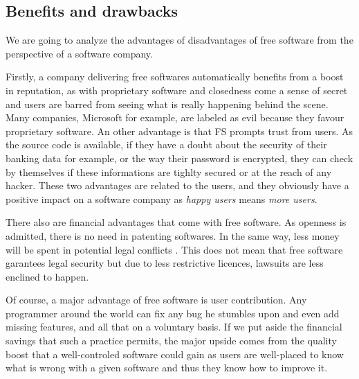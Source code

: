 \documentclass[12pt]{article}
\begin{document}
\subsection{Benefits and drawbacks}

We are going to analyze the advantages of disadvantages of free
software from the perspective of a software company.

Firstly, a company delivering free softwares automatically benefits
from a boost in reputation, as with proprietary software and
closedness come a sense of secret and users are barred from seeing
what is really happening behind the scene. Many companies, Microsoft
for example, are labeled as evil because they favour proprietary
software. An other advantage is that FS prompts trust from users. As
the source code is available, if they have a doubt about the security
of their banking data for example, or the way their password is
encrypted, they can check by themselves if these informations are
tighlty secured or at the reach of any hacker. These two advantages
are related to the users, and they obviously have a positive impact on
a software company as \textit{happy users} means \textit{more users}.

There also are financial advantages that come with free software. As
openness is admitted, there is no need in patenting softwares.  In the
same way, less money will be spent in potential legal conflicts
\cite{afses}. This does not mean that free software garantees legal
security but due to less restrictive licences, lawsuits are less
enclined to happen.

Of course, a major advantage of free software is user
contribution. Any programmer around the world can fix any bug he
stumbles upon and even add missing features, and all that on a
voluntary basis. If we put aside the financial savings that such a
practice permits, the major upside comes from the quality boost that a
well-controled software could gain as users are well-placed to know
what is wrong with a given software and thus they know how to improve
it.
\end{document}

